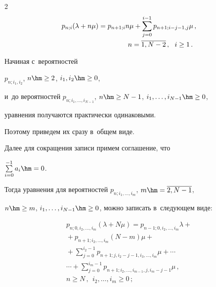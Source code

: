 \begin{multicols}{2}
\begin{align}
p_{n;i} (\lambda+n\mu) &= p_{n+1;i} n\mu +


\sum\limits_{j=0}^{i-1} p_{n+1;i-j-1,j} \mu \,,\notag\\ 


&\hspace*{15mm}n=\overline{1,N-2}\,,\ \ i \ge 1\,.


\label{eq-1-6}


\end{align}





Начиная с~вероятностей


$p_{n;i_1,i_2}$, $n\hm\ge2$, $i_1,i_2 \hm\ge 0$,


и~до вероятностей $p_{n;i_1,\ldots,i_{N-1}}$, $n\hm\ge N-1$, $i_1,\ldots,i_{N-1} \hm\ge 0$,


уравнения получаются практически одинаковыми.


Поэтому приведем их сразу в~общем виде.


Далее для сокращения записи примем соглашение, что


$\sum\limits_{i=0}^{-1} a_i \hm= 0$.


Тогда уравнения для вероятностей $p_{n;i_1,\ldots,i_{m}}$, $m\hm=\overline{2,N-1}$, 


$n \hm\ge m$, $i_1,\ldots,i_{N-1} \hm\ge 0$, можно записать в~следующем виде:


\begin{multline}


\label{bat-1}


p_{n;0,i_2,\ldots,i_m} (\lambda+N\mu) = p_{n-1;0,i_2,\ldots,i_m} \lambda+{}\\


{}+ p_{n+1;i_2,\ldots,i_m} (N-m) \mu +{}


\\


{}+ \sum\limits_{j=0}^{i_2-1} p_{n+1;j,i_2-j-1,i_3,\ldots,i_m} \mu


+ \cdots {}\\


{}\cdots + \sum\limits_{j=0}^{i_m-1} p_{n+1;i_2,\ldots,i_{m-1},j,i_m-j-1} \mu\,,\\


 n\ge N\,,\ \ i_2,\ldots,i_m \ge 0\,;


\end{multline}





\vspace*{-12pt}






\end{multicols}
